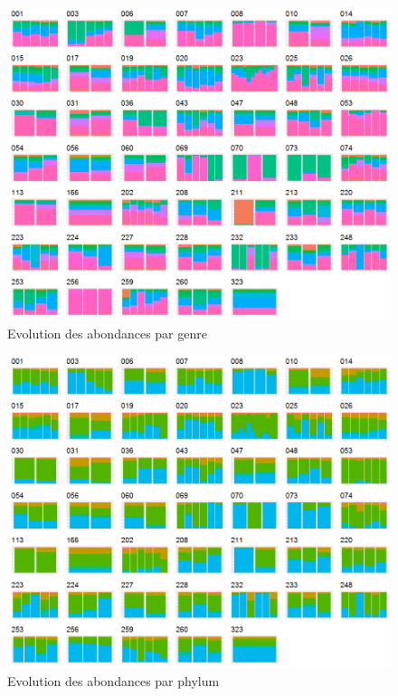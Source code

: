 \documentclass[12pt,a4paper]{article}
\begin{document}
\begin{figure}
\begin{center}
\includegraphics[scale=0.60]{img/enfin_barplot_genus_norm.png}\hfill
\end{center}
\caption{Evolution des abondances par genre}
\label{plotabundancegenre}
\end{figure}

\begin{figure}
\begin{center}
\includegraphics[scale=0.60]{img/enfin_barplot_phylum_norm.png}\hfill
\end{center}
\caption{Evolution des abondances par phylum}
\label{plotabundancephylum}
\end{figure}
\end{document}
